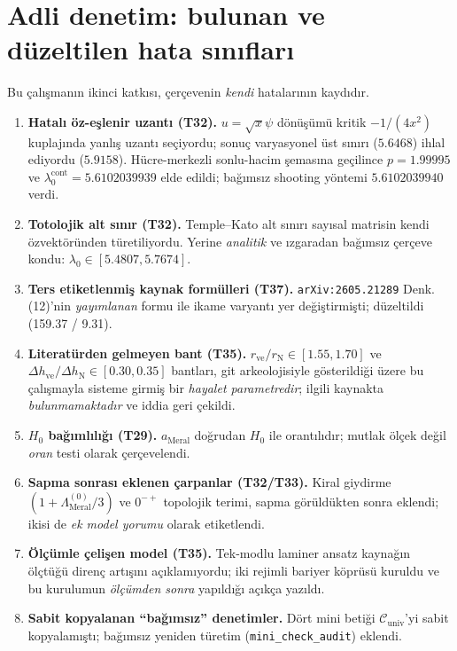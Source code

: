 \documentclass[12pt,a4paper]{article}
\begin{document}
\section{Adli denetim: bulunan ve düzeltilen hata sınıfları}
Bu çalışmanın ikinci katkısı, çerçevenin \emph{kendi} hatalarının kaydıdır.
\begin{enumerate}
    \item \textbf{Hatalı öz-eşlenir uzantı (T32).} $u=\sqrt{x}\psi$ dönüşümü
    kritik $-1/(4x^2)$ kuplajında yanlış uzantı seçiyordu; sonuç
    varyasyonel üst sınırı ($5.6468$) ihlal ediyordu ($5.9158$). Hücre-merkezli
    sonlu-hacim şemasına geçilince $p = 1.99995$ ve
    $\lambda_0^{\mathrm{cont}} = 5.6102039939$ elde edildi; bağımsız shooting
    yöntemi $5.6102039940$ verdi.
    \item \textbf{Totolojik alt sınır (T32).} Temple--Kato alt sınırı sayısal
    matrisin kendi özvektöründen türetiliyordu. Yerine \emph{analitik} ve
    ızgaradan bağımsız çerçeve kondu: $\lambda_0 \in [5.4807, 5.7674]$.
    \item \textbf{Ters etiketlenmiş kaynak formülleri (T37).}
    \texttt{arXiv:2605.21289} Denk.(12)'nin \emph{yayımlanan} formu ile
    ikame varyantı yer değiştirmişti; düzeltildi (159.37 / 9.31).
    \item \textbf{Literatürden gelmeyen bant (T35).} $r_{\mathrm{ve}}/r_{\mathrm{N}}
    \in [1.55,1.70]$ ve $\Delta h_{\mathrm{ve}}/\Delta h_{\mathrm{N}}
    \in [0.30,0.35]$ bantları, git arkeolojisiyle gösterildiği üzere bu çalışmayla
    sisteme girmiş bir \emph{hayalet parametredir}; ilgili kaynakta
    \emph{bulunmamaktadır} ve iddia geri çekildi.
    \item \textbf{$H_0$ bağımlılığı (T29).} $a_{\mathrm{Meral}}$ doğrudan
    $H_0$ ile orantılıdır; mutlak ölçek değil \emph{oran} testi olarak
    çerçevelendi.
    \item \textbf{Sapma sonrası eklenen çarpanlar (T32/T33).} Kiral
    giydirme $(1+\Lambda_{\mathrm{Meral}}^{(0)}/3)$ ve $0^{-+}$ topolojik
    terimi, sapma görüldükten sonra eklendi; ikisi de \emph{ek model
    yorumu} olarak etiketlendi.
    \item \textbf{Ölçümle çelişen model (T35).} Tek-modlu laminer ansatz
    kaynağın ölçtüğü direnç artışını açıklamıyordu; iki rejimli bariyer
    köprüsü kuruldu ve bu kurulumun \emph{ölçümden sonra} yapıldığı açıkça
    yazıldı.
    \item \textbf{Sabit kopyalanan ``bağımsız'' denetimler.} Dört mini betiği
    $\mathcal{C}_{\mathrm{univ}}$'yi sabit kopyalamıştı; bağımsız yeniden
    türetim (\texttt{mini\_check\_audit}) eklendi.
\end{enumerate}
\end{document}
